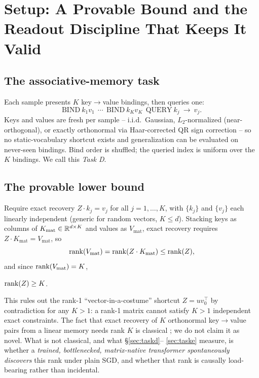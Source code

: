 \section{Setup: A Provable Bound and the Readout Discipline That Keeps It Valid}
\label{sec:setup}

\subsection{The associative-memory task}
\label{sec:setup-task}

Each sample presents $K$ key$\to$value bindings, then queries one:
\[
\mathrm{BIND}\ k_1 v_1\ \ \cdots\ \ \mathrm{BIND}\ k_K v_K\ \ \mathrm{QUERY}\ k_j\ \to\ v_j.
\]
Keys and values are fresh per sample -- i.i.d.\ Gaussian, $L_2$-normalized
(near-orthogonal), or exactly orthonormal via Haar-corrected QR sign
correction \citep{mezzadri2007random} -- so no static-vocabulary shortcut
exists and generalization can be evaluated on never-seen bindings. Bind
order is shuffled; the queried index is uniform over the $K$ bindings. We
call this \emph{Task D}.

\subsection{The provable lower bound}
\label{sec:setup-bound}

Require exact recovery $Z\cdot k_j = v_j$ for all $j=1,\dots,K$, with
$\{k_j\}$ and $\{v_j\}$ each linearly independent (generic for random
vectors, $K\leq d$). Stacking keys as columns of $K_{\mathrm{mat}}\in
\mathbb{R}^{d\times K}$ and values as $V_{\mathrm{mat}}$, exact recovery requires
$Z\cdot K_{\mathrm{mat}} = V_{\mathrm{mat}}$, so
\[
\operatorname{rank}(V_{\mathrm{mat}}) = \operatorname{rank}(Z\cdot K_{\mathrm{mat}}) \leq \operatorname{rank}(Z),
\]
and since $\operatorname{rank}(V_{\mathrm{mat}})=K$,
\begin{fact}
\label{fact:bound}
$\operatorname{rank}(Z)\geq K$.
\end{fact}
This rules out the rank-1 ``vector-in-a-costume'' shortcut $Z=u v_0^\top$
by contradiction for any $K>1$: a rank-1 matrix cannot satisfy $K>1$
independent exact constraints. The fact that exact recovery of $K$
orthonormal key$\to$value pairs from a linear memory needs rank $K$ is
classical \citep{kohonen1972correlation,anderson1972simple}; we do not
claim it as novel. What is not classical, and what \S\ref{sec:taskd}--
\ref{sec:taske} measure, is whether a \emph{trained, bottlenecked,
matrix-native transformer spontaneously discovers} this rank under plain
SGD, and whether that rank is causally load-bearing rather than incidental.

